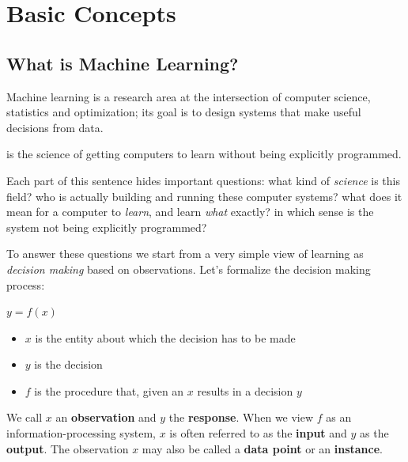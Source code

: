 \chapter{Basic Concepts}

\vspace{-0.5em}

\section{What is Machine Learning?}

Machine learning is a research area at the intersection of computer science, statistics and optimization; its goal is to design systems that make useful decisions from data.

\begin{definitionblock}
 is the science of getting computers to learn without being explicitly programmed.
\end{definitionblock}

Each part of this sentence hides important questions: what kind of \textit{science} is this field? who is actually building and running these computer systems? what does it mean for a computer to \textit{learn}, and learn \textit{what} exactly? in which sense is the system not being explicitly programmed?

To answer these questions we start from a very simple view of learning as \textit{decision making} based on observations.
Let's formalize the decision making process:

\medskip

\begin{minipage}{0.33\textwidth}
    \centering
    \texttt{$y = f(x)$}
\end{minipage}
\hfill
\begin{minipage}{0.65\textwidth}
    \begin{itemize}
        \item \texttt{$x$} is the entity about which the decision has to be made
        \item \texttt{$y$} is the decision
        \item \texttt{$f$} is the procedure that, given an \texttt{$x$} results in a decision \texttt{$y$}
    \end{itemize}
\end{minipage}

\medskip

We call $x$ an \textbf{observation} and $y$ the \textbf{response}. When we view $f$ as an information-processing system, $x$ is often referred to as the \textbf{input} and $y$ as the \textbf{output}. The observation $x$ may also be called a \textbf{data point} or an \textbf{instance}.                        

